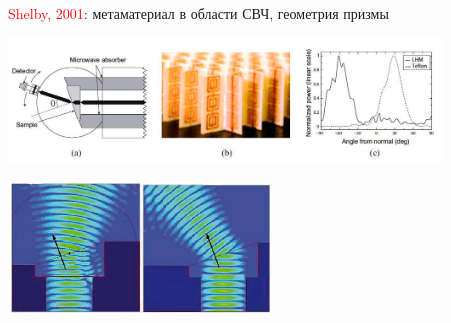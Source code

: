 \documentclass[9pt, compress, xcolor=table]{beamer}
\begin{document}
\begin{frame}{}

{\scriptsize \textcolor{red}{Shelby, 2001}: метаматериал в области СВЧ, геометрия призмы}
\begin{center}
\includegraphics[width=11.5cm]{neg_ref_9}
\end{center}

\begin{center}
\includegraphics[width=7cm]{neg_ref_10}
\end{center}
\end{frame}
\end{document}
